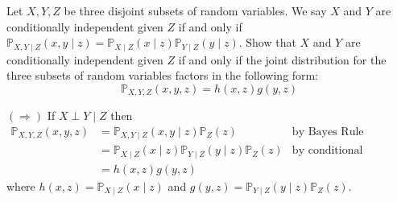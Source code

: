 \documentclass{article}
\begin{document}
\maketitle

\pagebreak

\setcounter{homeworkSectionCounter}{2}
\nobreak{}\nobreak{}

\begin{homeworkProblem}[2][1]

Let $X, Y, Z$ be three disjoint subsets of random variables. We say $X$ and $Y$
are conditionally independent given $Z$ if and only if
$\mathbb{P}_{X, Y \mid Z}(x, y \mid z)
  = \mathbb{P}_{X \mid Z}(x \mid z) \mathbb{P}_{Y\mid Z}(y \mid z)$.
Show that $X$ and $Y$ are conditionally independent given $Z$ if and
only if the joint distribution for the three subsets of random variables factors
in the following form:
\[
  \mathbb{P}_{X, Y, Z}(x, y, z)=h(x, z) g(y, z)
\]

\solution

$(\Longrightarrow)$ If $ X \perp Y \mid Z$ then
\begin{align*}
  \mathbb{P}_{X,Y,Z} (x, y, z)
    &= \mathbb{P}_{X,Y\mid Z} (x,y \mid z) \mathbb{P}_Z(z) & \text{by Bayes Rule} \\
    &= \mathbb{P}_{X\mid Z}(x\mid z)\mathbb{P}_{Y\mid Z}(y\mid z)
  \mathbb{P}_Z(z) & \text{by conditional independence}\\
                  &= h(x,z) g(y,z)
\end{align*}
where $h(x,z) = \mathbb{P}_{X\mid Z}(x\mid z)$ and $g(y,z) = \mathbb{P}_{Y\mid
Z}(y\mid z) \mathbb{P}_Z(z)$.


\end{homeworkProblem}
\end{document}

